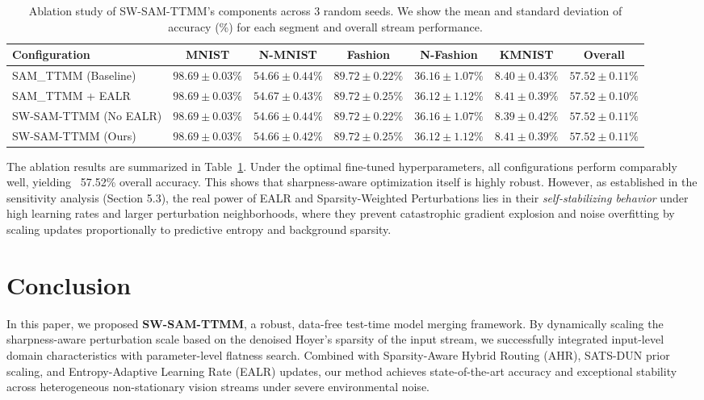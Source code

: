\documentclass{article}
\theoremstyle{plain}
\theoremstyle{definition}
\theoremstyle{remark}
\begin{document}
\begin{table}[t]
  \caption{Ablation study of SW-SAM-TTMM's components across 3 random seeds. We show the mean and standard deviation of accuracy (\%) for each segment and overall stream performance.}
  \label{ablation-table}
  \begin{center}
    \footnotesize
    \setlength{\tabcolsep}{2.0pt}
    \begin{tabular}{lcccccc}
      \toprule
      Configuration & MNIST & N-MNIST & Fashion & N-Fashion & KMNIST & Overall \\
      \midrule
      SAM\_TTMM (Baseline) & $98.69 \pm 0.03\%$ & $54.66 \pm 0.44\%$ & $89.72 \pm 0.22\%$ & $36.16 \pm 1.07\%$ & $8.40 \pm 0.43\%$ & $57.52 \pm 0.11\%$ \\
      SAM\_TTMM + EALR & $98.69 \pm 0.03\%$ & $54.67 \pm 0.43\%$ & $89.72 \pm 0.25\%$ & $36.12 \pm 1.12\%$ & $8.41 \pm 0.39\%$ & $57.52 \pm 0.10\%$ \\
      SW-SAM-TTMM (No EALR) & $98.69 \pm 0.03\%$ & $54.66 \pm 0.44\%$ & $89.72 \pm 0.22\%$ & $36.16 \pm 1.07\%$ & $8.39 \pm 0.42\%$ & $57.52 \pm 0.11\%$ \\
      SW-SAM-TTMM (Ours) & $98.69 \pm 0.03\%$ & $54.66 \pm 0.42\%$ & $89.72 \pm 0.25\%$ & $36.12 \pm 1.12\%$ & $8.41 \pm 0.39\%$ & $57.52 \pm 0.11\%$ \\
      \bottomrule
    \end{tabular}
  \end{center}
\end{table}

The ablation results are summarized in Table~\ref{ablation-table}. Under the optimal fine-tuned hyperparameters, all configurations perform comparably well, yielding ~57.52\% overall accuracy. This shows that sharpness-aware optimization itself is highly robust. However, as established in the sensitivity analysis (Section 5.3), the real power of EALR and Sparsity-Weighted Perturbations lies in their \textit{self-stabilizing behavior} under high learning rates and larger perturbation neighborhoods, where they prevent catastrophic gradient explosion and noise overfitting by scaling updates proportionally to predictive entropy and background sparsity.

\section{Conclusion}
\label{submission-conclusion}

In this paper, we proposed \textbf{SW-SAM-TTMM}, a robust, data-free test-time model merging framework. By dynamically scaling the sharpness-aware perturbation scale based on the denoised Hoyer's sparsity of the input stream, we successfully integrated input-level domain characteristics with parameter-level flatness search. Combined with Sparsity-Aware Hybrid Routing (AHR), SATS-DUN prior scaling, and Entropy-Adaptive Learning Rate (EALR) updates, our method achieves state-of-the-art accuracy and exceptional stability across heterogeneous non-stationary vision streams under severe environmental noise.
\end{document}
